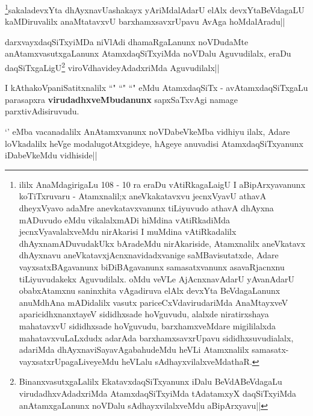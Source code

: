 
\begin{artha}
\footnote{ililx AnaMdagirigaLu 108 - 10 ra eraDu vAtiRkagaLaigU I aBipArxyavanunx koTiTxruvaru - Atamxnalil;x aneVkakatavxvu jecnxVyavU athavA dheyxVyavo adaMre anevkatavxvanunx tiLiyuvudo athavA dhAyxna mADuvudo eMdu vikalalxmADi hiMdina vAtiRkadiMda jecnxVyavalalxveMdu nirAkarisi I muMdina vAtiRkadalilx dhAyxnamADuvudakUkx bAradeMdu nirAkariside, Atamxnalilx aneVkatavx dhAyxnavu aneVkatavxjAcnxnavidadxvanige saMBavisutatxde, Adare vayxsatxBAgavanunx biDiBAgavanunx samasatxvanunx asavaRjacnxnu tiLiyuvudakekx Aguvudilalx. oMdu veVLe AjAcnxnavAdarU yAvanAdarU obabxAtamxnu saninxhita vAgadiruva elAlx devxYta BeVdagaLanunx anuMdhAna mADidalilx vasutx pariceCxVdavirudariMda AnaMtayxveV aparicidhxnanxtayeV sididhxsade hoVguvudu, alalxde niratirxshaya mahatavxvU sididhxsade hoVguvudu, barxhamxveMdare migililalxda mahatavxvuLaLxdudx adarAda barxhamxsavxrUpavu sididhxsuvudialalx, adariMda dhAyxnaviSayavAgabahudeMdu heVLi Atamxnalilx samasatx-vayxsatxrUpagaLiveyeMdu heVLalu sAdhayxvilalxveMdathaR.}sakaladevxYta dhAyxnavUashakayx yAriMdalAdarU elAlx devxYtaBeVdagaLU kaMDiruvalilx anaMtatavxvU barxhamxsavxrUpavu AvAga hoMdalAradu||
\end{artha}

\begin{artha}
darxvayxdaqSiTxyiMDa niVlAdi dhamaRgaLanunx noVDudaMte anAtamxvasutxgaLanunx AtamxdaqSiTxyiMda noVDalu Aguvudilalx, eraDu daqSiTxgaLigU\footnote[2]{BinanxvasutxgaLalilx EkatavxdaqSiTxyanunx iDalu BeVdABeVdagaLu virudadhxvAdadxriMda AtamxdaqSiTxyiMda tAdatamxyX daqSiTxyiMda anAtamxgaLanunx noVDalu sAdhayxvilalxveMdu aBipArxyavu||} viroVdhavideyAdadxriMda Aguvudilalx||
\end{artha}


\begin{artha}
I kAthakoVpaniSatitxnalilx ``\stext" ``\stext" ``\stext" eMdu AtamxdaqSiTx - avAtamxdaqSiTxgaLu parasapxra \textbf{virudadhxveMbudanunx} sapxSaTxvAgi namage parxtivAdisiruvudu.
\end{artha}


`\stext' eMba vacanadalilx AnAtamxvanunx noVDabeVkeMba vidhiyu ilalx, Adare loVkadalilx heVge modalugotAtxgideye, hAgeye anuvadisi AtamxdaqSiTxyanunx iDabeVkeMdu vidhiside||

